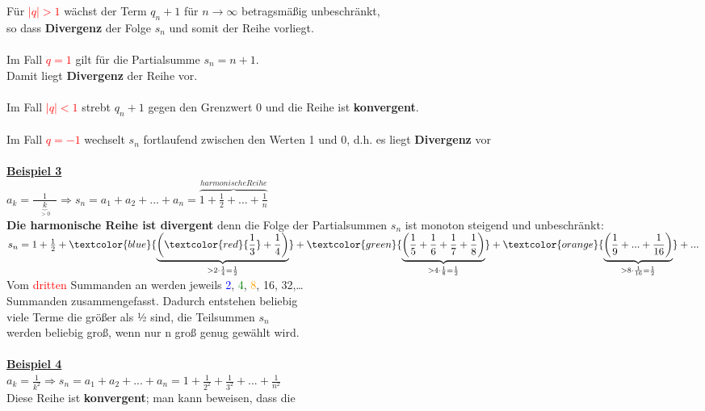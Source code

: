 \documentclass[12pt,a4paper]{article}
\begin{document}
Für \textcolor{red}{$|q|>1$} wächst der Term $q_n+1$ für $n\rightarrow\infty$ betragsmäßig unbeschränkt,\\ so dass \textbf{Divergenz} der Folge $s_n$ und somit der Reihe vorliegt.
\\
\\
Im Fall \textcolor{red}{$q=1$} gilt für die Partialsumme $s_n=n+1$.\\Damit liegt \textbf{Divergenz} der Reihe vor.
\\
\\
Im Fall \textcolor{red}{$|q|<1$} strebt $q_n+1$ gegen den Grenzwert 0 und die Reihe ist \textbf{konvergent}.
\\
\\
Im Fall \textcolor{red}{$q=-1$} wechselt $s_n$ fortlaufend zwischen den Werten 1 und 0, d.h. es liegt \textbf{Divergenz} vor
\\
\\
\underline{\textbf{Beispiel 3}}\\
$a_k=\frac{1}{\phantom{...}\underbrace{k}_{>0}\phantom{...}}\Rightarrow s_n=a_1+a_2+...+a_n=\overbrace{1+\frac{1}{2}+...+\frac{1}{n}}^{harmonische Reihe}$\\
\textbf{Die harmonische Reihe ist divergent} denn die Folge der Partialsummen $s_n$ ist monoton steigend und unbeschränkt:\\
$s_n=1+\frac{1}{2}+\textcolor{blue}{\underbrace{\biggl(\textcolor{red}{\frac{1}{3}}+\frac{1}{4}\biggr)}_{>2\cdot\frac{1}{4}=\frac{1}{2}}}+\textcolor{green}{\underbrace{\biggl(\frac{1}{5}+\frac{1}{6}+\frac{1}{7}+\frac{1}{8}\biggr)}_{>4\cdot\frac{1}{8}=\frac{1}{2}}}+\textcolor{orange}{\underbrace{\biggl(\frac{1}{9}+...+\frac{1}{16}\biggr)}_{>8\cdot\frac{1}{16}=\frac{1}{2}}}+...$
\\
Vom \textcolor{red}{dritten} Summanden an werden jeweils \textcolor{blue}{2}, \textcolor{green}{4}, \textcolor{orange}{8}, 16, 32,…\\
Summanden zusammengefasst. Dadurch entstehen beliebig\\
viele Terme die größer als ½ sind, die Teilsummen $s_n$\\
werden beliebig groß, wenn nur n groß genug gewählt wird. \\
\\
\underline{\textbf{Beispiel 4}}\\
$a_k=\frac{1}{k^2}\Rightarrow s_n=a_1+a_2+...+a_n=1+\frac{1}{2^2}+\frac{1}{3^2}+...+\frac{1}{n^2}$
\\
Diese Reihe ist \textbf{konvergent}; man kann beweisen, dass die\\
\end{document}
